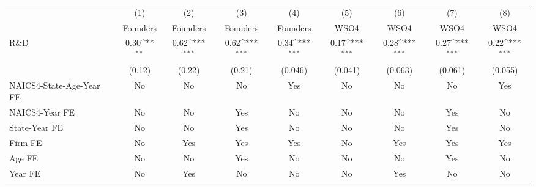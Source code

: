 {
\def\sym#1{\ifmmode^{#1}\else\(^{#1}\)\fi}
\begin{tabular}{l*{8}{c}}
\toprule
                    &\multicolumn{1}{c}{(1)}&\multicolumn{1}{c}{(2)}&\multicolumn{1}{c}{(3)}&\multicolumn{1}{c}{(4)}&\multicolumn{1}{c}{(5)}&\multicolumn{1}{c}{(6)}&\multicolumn{1}{c}{(7)}&\multicolumn{1}{c}{(8)}\\
                    &\multicolumn{1}{c}{Founders}&\multicolumn{1}{c}{Founders}&\multicolumn{1}{c}{Founders}&\multicolumn{1}{c}{Founders}&\multicolumn{1}{c}{WSO4}&\multicolumn{1}{c}{WSO4}&\multicolumn{1}{c}{WSO4}&\multicolumn{1}{c}{WSO4}\\
\midrule
R\&D                &        0.30\sym{**} &        0.62\sym{***}&        0.62\sym{***}&        0.34\sym{***}&        0.17\sym{***}&        0.28\sym{***}&        0.27\sym{***}&        0.22\sym{***}\\
                    &      (0.12)         &      (0.22)         &      (0.21)         &     (0.046)         &     (0.041)         &     (0.063)         &     (0.061)         &     (0.055)         \\
\addlinespace
NAICS4-State-Age-Year FE&          No         &          No         &          No         &         Yes         &          No         &          No         &          No         &         Yes         \\
\addlinespace
NAICS4-Year FE      &          No         &          No         &         Yes         &          No         &          No         &          No         &         Yes         &          No         \\
\addlinespace
State-Year FE       &          No         &          No         &         Yes         &          No         &          No         &          No         &         Yes         &          No         \\
\addlinespace
Firm FE             &          No         &         Yes         &         Yes         &         Yes         &          No         &         Yes         &         Yes         &         Yes         \\
\addlinespace
Age FE              &          No         &          No         &         Yes         &          No         &          No         &          No         &         Yes         &          No         \\
\addlinespace
Year FE             &          No         &         Yes         &          No         &          No         &          No         &         Yes         &          No         &          No         \\

\end{tabular}}
